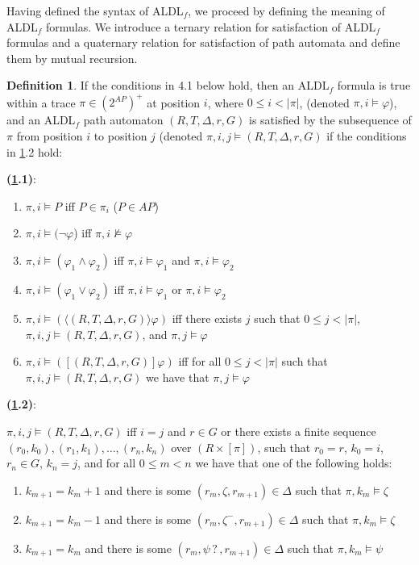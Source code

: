 \documentclass[10pt,a4paper]{amsart}
\theoremstyle{plain}
\theoremstyle{definition}
\newtheorem{definition}[thm]{Definition}
\theoremstyle{definition}
\newcommand{\dbox}[1]{\langle #1 \rangle}
\newcommand{\bbox}[1]{[ #1 ]}
\DeclareMathOperator{\?}{?}
\begin{document}
Having defined the syntax of ALDL$_f$, we proceed by defining the meaning of ALDL$_f$ formulas. We introduce a ternary relation for satisfaction of ALDL$_f$ formulas and a quaternary relation for
satisfaction of path automata and define them by mutual recursion.

\begin{definition}\label{def:aldlf_semantics}
If the conditions in 4.1 below hold, then
an ALDL$_f$ formula is true within a trace $\pi \in (2^{AP})^+$ at position $i$,
    where $0 \leq i < |\pi|$, (denoted $\pi,i \models \varphi$),
    and an ALDL$_f$ path automaton $(R,T,\Delta,r,G)$ is satisfied by the subsequence of $\pi$ from position $i$ to position $j$ (denoted
    $\pi,i,j \models (R,T,\Delta,r,G)$ if the conditions in \ref{def:aldlf_semantics}.2 hold:

    \textbf{(\ref{def:aldlf_semantics}.1)}:
    \begin{enumerate}[label=A\arabic*.]
    \item $\pi,i \models P$ iff $P \in \pi_i$ ($P \in AP$)
    \item $\pi,i \models (\neg\varphi$) iff $\pi,i \not\models \varphi$
    \item $\pi,i \models (\varphi_1 \wedge \varphi_2)$ iff $\pi,i \models \varphi_1$ and $\pi,i \models \varphi_2$
    \item $\pi,i \models (\varphi_1 \vee \varphi_2)$ iff $\pi,i \models \varphi_1$ or $\pi,i \models \varphi_2$
    \item $\pi,i \models (\dbox{(R,T,\Delta,r,G)}\varphi)$ iff there exists $j$ such that $0 \leq j < |\pi|$, $\pi,i,j \models (R,T,\Delta,r,G)$, and $\pi,j \models \varphi$
    \item $\pi,i \models (\bbox{(R,T,\Delta,r,G)}\varphi)$ iff for all $0 \leq j < |\pi|$ such that $\pi,i,j \models (R,T,\Delta,r,G)$ we have that $\pi,j \models \varphi$
    \end{enumerate}


    \textbf{(\ref{def:aldlf_semantics}.2)}:

$\pi,i,j \models (R,T,\Delta,r,G)$ iff $i = j$ and $r \in G$ or there exists a finite sequence $(r_0,k_0),\allowbreak (r_1,k_1),\ldots,(r_n,k_n)$ over $(R \times [\pi])$,  such that $r_0 = r$, $k_0 = i$, $r_n \in G$, $k_n = j$, and for all $0 \leq m < n$ we have that one of the following holds:

\begin{enumerate}
    \item $k_{m+1} = k_m + 1$ and there is some $(r_m,\zeta,r_{m+1}) \in \Delta$ such that $\pi,k_m \models \zeta$
    \item $k_{m+1} = k_m - 1$ and there is some $(r_m,\zeta^-,r_{m+1}) \in \Delta$ such that $\pi,k_m \models \zeta$
    \item $k_{m+1} = k_m$ and there is some $(r_m,\psi\?,r_{m+1}) \in \Delta$ such that $\pi,k_m \models \psi$
\end{enumerate}

\end{definition}
\end{document}
